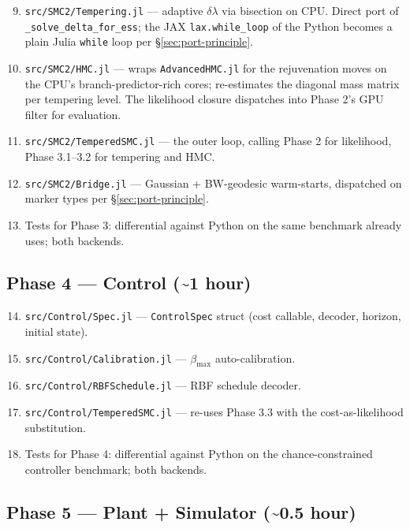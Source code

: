 \documentclass[11pt,a4paper]{article}
\begin{document}
\begin{enumerate}\setcounter{enumi}{8}
\item \texttt{src/SMC2/Tempering.jl} --- adaptive
  $\delta\lambda$ via bisection on CPU. Direct port of
  \texttt{\_solve\_delta\_for\_ess}; the JAX
  \texttt{lax.while\_loop} of the Python becomes a plain Julia
  \texttt{while} loop per §\ref{sec:port-principle}.
\item \texttt{src/SMC2/HMC.jl} --- wraps \texttt{AdvancedHMC.jl}
  for the rejuvenation moves on the CPU's branch-predictor-rich
  cores; re-estimates the diagonal mass matrix per tempering
  level. The likelihood closure dispatches into Phase 2's GPU
  filter for evaluation.
\item \texttt{src/SMC2/TemperedSMC.jl} --- the outer loop, calling
  Phase 2 for likelihood, Phase 3.1--3.2 for tempering and HMC.
\item \texttt{src/SMC2/Bridge.jl} --- Gaussian + BW-geodesic
  warm-starts, dispatched on marker types per
  §\ref{sec:port-principle}.
\item Tests for Phase 3: differential against Python on the same
  benchmark  already uses;
  both backends.
\end{enumerate}

\subsection{Phase 4 --- Control (\textasciitilde 1 hour)}

\begin{enumerate}\setcounter{enumi}{13}
\item \texttt{src/Control/Spec.jl} --- \texttt{ControlSpec}
  struct (cost callable, decoder, horizon, initial state).
\item \texttt{src/Control/Calibration.jl} --- $\beta_{\max}$
  auto-calibration.
\item \texttt{src/Control/RBFSchedule.jl} --- RBF schedule
  decoder.
\item \texttt{src/Control/TemperedSMC.jl} --- re-uses Phase 3.3
  with the cost-as-likelihood substitution.
\item Tests for Phase 4: differential against Python on the
  chance-constrained controller benchmark; both backends.
\end{enumerate}

\subsection{Phase 5 --- Plant + Simulator (\textasciitilde 0.5
hour)}
\end{document}
